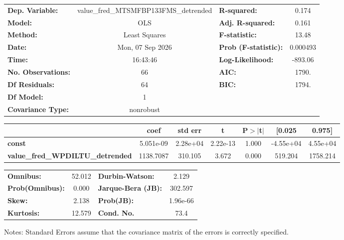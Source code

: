 \begin{center}
\begin{tabular}{lclc}
\toprule
\textbf{Dep. Variable:}                  & value\_fred\_MTSMFBP133FMS\_detrended & \textbf{  R-squared:         } &     0.174   \\
\textbf{Model:}                          &                  OLS                  & \textbf{  Adj. R-squared:    } &     0.161   \\
\textbf{Method:}                         &             Least Squares             & \textbf{  F-statistic:       } &     13.48   \\
\textbf{Date:}                           &            Mon, 07 Sep 2026           & \textbf{  Prob (F-statistic):} &  0.000493   \\
\textbf{Time:}                           &                16:43:46               & \textbf{  Log-Likelihood:    } &   -893.06   \\
\textbf{No. Observations:}               &                     66                & \textbf{  AIC:               } &     1790.   \\
\textbf{Df Residuals:}                   &                     64                & \textbf{  BIC:               } &     1794.   \\
\textbf{Df Model:}                       &                      1                & \textbf{                     } &             \\
\textbf{Covariance Type:}                &               nonrobust               & \textbf{                     } &             \\
\bottomrule
\end{tabular}
\begin{tabular}{lcccccc}
                                         & \textbf{coef} & \textbf{std err} & \textbf{t} & \textbf{P$> |$t$|$} & \textbf{[0.025} & \textbf{0.975]}  \\
\midrule
\textbf{const}                           &    5.051e-09  &     2.28e+04     &  2.22e-13  &         1.000        &    -4.55e+04    &     4.55e+04     \\
\textbf{value\_fred\_WPDILTU\_detrended} &    1138.7087  &      310.105     &     3.672  &         0.000        &      519.204    &     1758.214     \\
\bottomrule
\end{tabular}
\begin{tabular}{lclc}
\textbf{Omnibus:}       & 52.012 & \textbf{  Durbin-Watson:     } &    2.129  \\
\textbf{Prob(Omnibus):} &  0.000 & \textbf{  Jarque-Bera (JB):  } &  302.597  \\
\textbf{Skew:}          &  2.138 & \textbf{  Prob(JB):          } & 1.96e-66  \\
\textbf{Kurtosis:}      & 12.579 & \textbf{  Cond. No.          } &     73.4  \\
\bottomrule
\end{tabular}
\end{center}

Notes: \newline
 [1] Standard Errors assume that the covariance matrix of the errors is correctly specified.